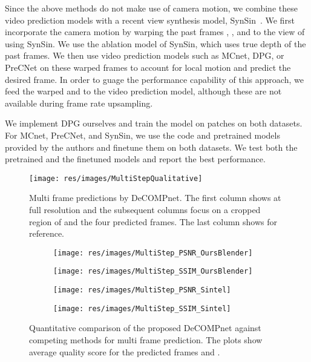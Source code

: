 \documentclass[preprint]{vgtc}
\begin{document}
    Since the above methods do not make use of camera motion, we combine these video prediction models with a recent view synthesis model, SynSin~\cite{wiles2020synsin}.
    We first incorporate the camera motion by warping the past frames , ,  and  to the view of  using SynSin.
    We use the ablation model of SynSin, which uses true depth of the past frames.
    We then use video prediction models such as MCnet, DPG, or PreCNet on these warped frames to account for local motion and predict the desired frame.
    In order to guage the performance capability of this approach, we feed the warped  and  to the video prediction model, although these are not available during frame rate upsampling.

    We implement DPG ourselves and train the model on  patches on both datasets.
    For MCnet, PreCNet, and SynSin, we use the code and pretrained models provided by the authors and finetune them on both datasets.
    We test both the pretrained and the finetuned models and report the best performance.
    
    \begin{figure*}
        \centering
        \texttt{[image: res/images/MultiStepQualitative]}
        \caption{Multi frame predictions by DeCOMPnet.
        The first column shows  at full resolution and the subsequent columns focus on a cropped region of  and the four predicted frames.
        The last column shows  for reference.
        }
        \label{fig:multistep-qualitative}
    \end{figure*}
    \begin{figure*}
        \centering
        \begin{subfigure}{.24\textwidth}
            \centering
            \texttt{[image: res/images/MultiStep\_PSNR\_OursBlender]}
        \end{subfigure}
        \begin{subfigure}{.24\textwidth}
            \centering
            \texttt{[image: res/images/MultiStep\_SSIM\_OursBlender]}
        \end{subfigure}
        \begin{subfigure}{.24\textwidth}
            \centering
            \texttt{[image: res/images/MultiStep\_PSNR\_Sintel]}
        \end{subfigure}
        \begin{subfigure}{.24\textwidth}
            \centering
            \texttt{[image: res/images/MultiStep\_SSIM\_Sintel]}
        \end{subfigure}
        \caption{Quantitative comparison of the proposed DeCOMPnet against competing methods for multi frame prediction.
The plots show average quality score for the predicted frames  and .
        }
        \label{fig:multistep-quantitative}
    \end{figure*}
\end{document}

